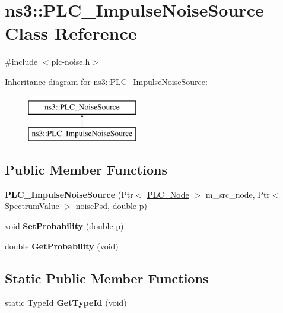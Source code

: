 \hypertarget{classns3_1_1PLC__ImpulseNoiseSource}{\section{ns3\-:\-:\-P\-L\-C\-\_\-\-Impulse\-Noise\-Source \-Class \-Reference}
\label{classns3_1_1PLC__ImpulseNoiseSource}
}


{\ttfamily \#include $<$plc-\/noise.\-h$>$}

\-Inheritance diagram for ns3\-:\-:\-P\-L\-C\-\_\-\-Impulse\-Noise\-Source\-:\begin{figure}[H]
\begin{center}
\leavevmode
\includegraphics[height=2.000000cm]{classns3_1_1PLC__ImpulseNoiseSource}
\end{center}
\end{figure}
\subsection*{\-Public \-Member \-Functions}
\begin{DoxyCompactItemize}
\item 
\hypertarget{classns3_1_1PLC__ImpulseNoiseSource_a7027fcf2ad3cf9442e3207112cbb0f9b}{{\bfseries \-P\-L\-C\-\_\-\-Impulse\-Noise\-Source} (\-Ptr$<$ \hyperlink{classns3_1_1PLC__Node}{\-P\-L\-C\-\_\-\-Node} $>$ m\-\_\-src\-\_\-node, \-Ptr$<$ \-Spectrum\-Value $>$ noise\-Psd, double p)}\label{classns3_1_1PLC__ImpulseNoiseSource_a7027fcf2ad3cf9442e3207112cbb0f9b}

\item 
\hypertarget{classns3_1_1PLC__ImpulseNoiseSource_ad16655e5287e7144e8e02aa95fce0134}{void {\bfseries \-Set\-Probability} (double p)}\label{classns3_1_1PLC__ImpulseNoiseSource_ad16655e5287e7144e8e02aa95fce0134}

\item 
\hypertarget{classns3_1_1PLC__ImpulseNoiseSource_a8b5d15fb465aeaa71947e3e8f16567fc}{double {\bfseries \-Get\-Probability} (void)}\label{classns3_1_1PLC__ImpulseNoiseSource_a8b5d15fb465aeaa71947e3e8f16567fc}

\end{DoxyCompactItemize}
\subsection*{\-Static \-Public \-Member \-Functions}
\begin{DoxyCompactItemize}
\item 
\hypertarget{classns3_1_1PLC__ImpulseNoiseSource_a3bc892efc4cd33d4fc67f201b51bc3f9}{static \-Type\-Id {\bfseries \-Get\-Type\-Id} (void)}\label{classns3_1_1PLC__ImpulseNoiseSource_a3bc892efc4cd33d4fc67f201b51bc3f9}

\end{DoxyCompactItemize}


